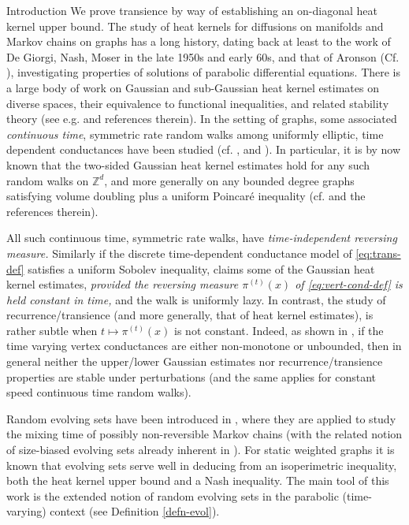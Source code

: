 \documentclass[12pt,reqno]{amsart}
\numberwithin{equation}{section}
\theoremstyle{definition}
\begin{document}
\begin{section}{Introduction}
We prove transience by way of establishing an on-diagonal heat kernel upper bound. The study of heat kernels for diffusions on manifolds and Markov chains on graphs has a long history, dating back at least to the work of De Giorgi, Nash, Moser in the late 1950s and early 60s, and that of Aronson (Cf. \cite{Ar}), investigating properties of solutions of parabolic differential equations. There is a large body of work on Gaussian and sub-Gaussian heat kernel estimates on diverse spaces, their equivalence to functional inequalities, and related stability theory (see e.g. \cite{SC, Gr, St1, St2, CGZ, De, HS} and references therein). In the setting of graphs, some associated \emph{continuous time}, symmetric rate random walks among uniformly elliptic, time dependent conductances 
have been studied (cf. \cite[Section 4]{DD}, \cite[Appendix B]{GOS} and \cite[Theorem 1.1]{GP}). In particular, it is by now known that the two-sided Gaussian heat kernel estimates hold for any such random walks on ${\mathbb{Z}}^d$, and more generally on any bounded degree graphs satisfying volume doubling plus a uniform Poincar\'{e} inequality (cf. \cite[Theorem 1.2]{HK} and the references therein). 

All such continuous time, symmetric rate walks, have \emph{time-independent 
reversing measure.} Similarly if the discrete time-dependent
conductance model of \eqref{eq:trans-def} satisfies
a uniform Sobolev inequality, \cite[Section 7]{CGZ} claims 
some of the 
Gaussian heat kernel estimates, \emph{provided the reversing measure
$\pi^{(t)}(x)$ of \eqref{eq:vert-cond-def} is held constant in time,} and the walk is uniformly lazy.
In contrast, the study of recurrence/transience (and more generally, 
that of heat kernel estimates), is rather subtle when 
$t \mapsto \pi^{(t)}(x)$ is not constant. Indeed, as shown in 
\cite[Propositions 1.3,1.4]{HK}, if the time varying vertex conductances
are either non-monotone or unbounded, then in general 
neither the upper/lower Gaussian estimates nor recurrence/transience 
properties are stable under perturbations (and the same applies
for constant speed continuous time random walks). 

Random evolving sets have been introduced in \cite{MP1,MP2}, where they are applied 
to study the mixing time of possibly non-reversible Markov chains 
(with the related notion of size-biased evolving sets already inherent in \cite{DF}). 
For static weighted graphs it is known that evolving sets serve well in 
deducing from an isoperimetric inequality, both the heat kernel upper bound 
and a Nash inequality. The main tool of this work is the extended notion of 
random evolving sets in the parabolic (time-varying) context 
(see Definition \ref{defn-evol}).


\end{section}
\end{document}
